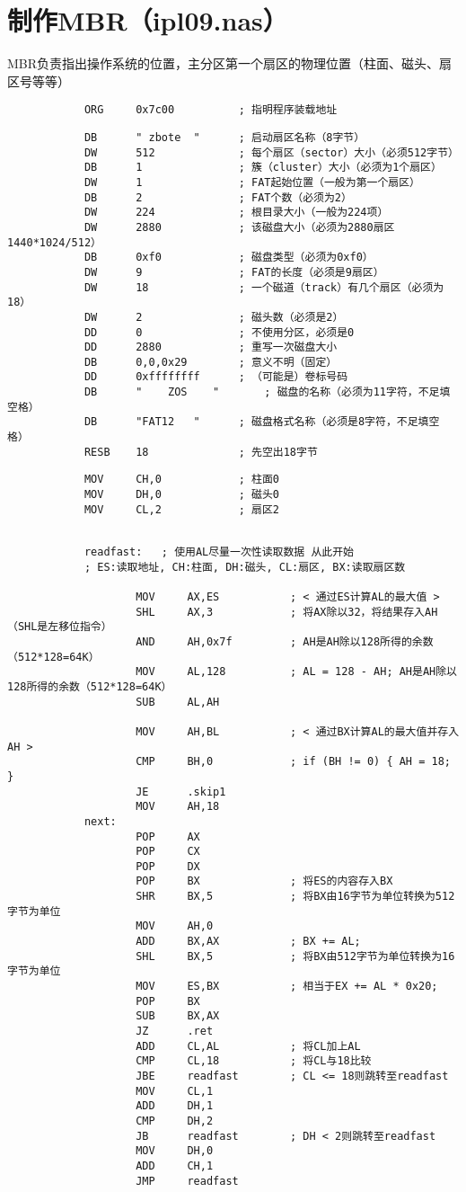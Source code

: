 \documentclass{swfcthesis}
\begin{document}
	\section{制作MBR（ipl09.nas）}
		MBR负责指出操作系统的位置，主分区第一个扇区的物理位置（柱面、磁头、扇区号等等）
		\begin{verbatim}
			ORG		0x7c00			; 指明程序装载地址
		\end{verbatim}
		\begin{verbatim}
			DB		" zbote  "		; 启动扇区名称（8字节）
			DW		512				; 每个扇区（sector）大小（必须512字节）
			DB		1				; 簇（cluster）大小（必须为1个扇区）
			DW		1				; FAT起始位置（一般为第一个扇区）
			DB		2				; FAT个数（必须为2）
			DW		224				; 根目录大小（一般为224项）
			DW		2880			; 该磁盘大小（必须为2880扇区1440*1024/512）
			DB		0xf0			; 磁盘类型（必须为0xf0）
			DW		9				; FAT的长度（必须是9扇区）
			DW		18				; 一个磁道（track）有几个扇区（必须为18）
			DW		2				; 磁头数（必须是2）
			DD		0				; 不使用分区，必须是0
			DD		2880			; 重写一次磁盘大小
			DB		0,0,0x29		; 意义不明（固定）
			DD		0xffffffff		; （可能是）卷标号码
			DB		"    ZOS    "		; 磁盘的名称（必须为11字符，不足填空格）
			DB		"FAT12   "		; 磁盘格式名称（必须是8字符，不足填空格）
			RESB	18				; 先空出18字节
		\end{verbatim}
		\begin{verbatim}
			MOV		CH,0			; 柱面0
			MOV		DH,0			; 磁头0
			MOV		CL,2			; 扇区2
		\end{verbatim}
		\begin{verbatim}
			
			readfast:	; 使用AL尽量一次性读取数据 从此开始
			; ES:读取地址, CH:柱面, DH:磁头, CL:扇区, BX:读取扇区数

					MOV		AX,ES			; < 通过ES计算AL的最大值 >
					SHL		AX,3			; 将AX除以32，将结果存入AH（SHL是左移位指令）
					AND		AH,0x7f			; AH是AH除以128所得的余数（512*128=64K）
					MOV		AL,128			; AL = 128 - AH; AH是AH除以128所得的余数（512*128=64K）
					SUB		AL,AH

					MOV		AH,BL			; < 通过BX计算AL的最大值并存入AH >
					CMP		BH,0			; if (BH != 0) { AH = 18; }
					JE		.skip1
					MOV		AH,18
			next:
					POP		AX
					POP		CX
					POP		DX
					POP		BX				; 将ES的内容存入BX
					SHR		BX,5			; 将BX由16字节为单位转换为512字节为单位
					MOV		AH,0
					ADD		BX,AX			; BX += AL;
					SHL		BX,5			; 将BX由512字节为单位转换为16字节为单位
					MOV		ES,BX			; 相当于EX += AL * 0x20;
					POP		BX
					SUB		BX,AX
					JZ		.ret
					ADD		CL,AL			; 将CL加上AL
					CMP		CL,18			; 将CL与18比较
					JBE		readfast		; CL <= 18则跳转至readfast
					MOV		CL,1
					ADD		DH,1
					CMP		DH,2
					JB		readfast		; DH < 2则跳转至readfast
					MOV		DH,0
					ADD		CH,1
					JMP		readfast
		\end{verbatim}
	
\end{document}
